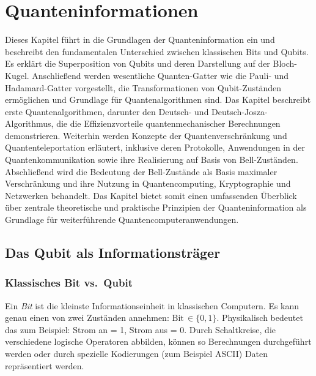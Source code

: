 \chapter{Quanteninformationen}
\label{qbits} %


\abstract{}
Dieses Kapitel führt in die Grundlagen der Quanteninformation ein und beschreibt den fundamentalen Unterschied zwischen klassischen Bits und Qubits. Es erklärt die Superposition von Qubits und deren Darstellung auf der Bloch-Kugel. Anschließend werden wesentliche Quanten-Gatter wie die Pauli- und Hadamard-Gatter vorgestellt, die Transformationen von Qubit-Zuständen ermöglichen und Grundlage für Quantenalgorithmen sind. Das Kapitel beschreibt erste Quantenalgorithmen, darunter den Deutsch- und Deutsch-Josza-Algorithmus, die die Effizienzvorteile quantenmechanischer Berechnungen demonstrieren. Weiterhin werden Konzepte der Quantenverschränkung und Quantenteleportation erläutert, inklusive deren Protokolle, Anwendungen in der Quantenkommunikation sowie ihre Realisierung auf Basis von Bell-Zuständen. Abschließend wird die Bedeutung der Bell-Zustände als Basis maximaler Verschränkung und ihre Nutzung in Quantencomputing, Kryptographie und Netzwerken behandelt. Das Kapitel bietet somit einen umfassenden Überblick über zentrale theoretische und praktische Prinzipien der Quanteninformation als Grundlage für weiterführende Quantencomputeranwendungen.

\section{Das Qubit als Informationsträger}
\label{Das Qubit als Informationsträger}
\subsection{Klassisches Bit vs.\ Qubit}
Ein \emph{Bit} ist die kleinste Informationseinheit in klassischen Computern. Es kann genau einen von zwei Zuständen annehmen: $\text{Bit}\,\in\{0,1\}$.
Physikalisch bedeutet das zum Beispiel: Strom an = 1, Strom aus = 0. Durch Schaltkreise, die verschiedene logische Operatoren abbilden, können so Berechnungen durchgeführt werden oder durch spezielle Kodierungen (zum Beispiel ASCII) Daten repräsentiert werden.

